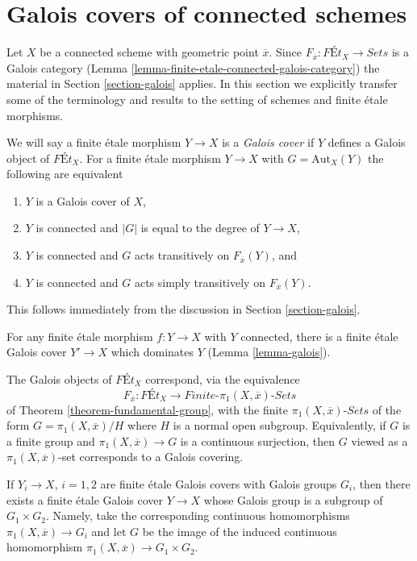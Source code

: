 \documentclass{stacks-project}
\theoremstyle{plain}
\theoremstyle{definition}
\theoremstyle{remark}
\numberwithin{equation}{subsection}
\begin{document}
\section{Galois covers of connected schemes}
\label{section-finite-etale-under-galois}

\noindent
Let $X$ be a connected scheme with geometric point $\overline{x}$.
Since $F_{\overline{x}} : \textit{F\'Et}_X \to \textit{Sets}$ is a
Galois category (Lemma \ref{lemma-finite-etale-connected-galois-category})
the material in Section \ref{section-galois} applies.
In this section we explicitly transfer some of the terminology
and results to the setting of schemes and finite \'etale morphisms.

\medskip\noindent
We will say a finite \'etale morphism $Y \to X$ is a
{\it Galois cover} if $Y$ defines a Galois object of
$\textit{F\'Et}_X$.
For a finite \'etale morphism $Y \to X$ with $G = \text{Aut}_X(Y)$
the following are equivalent
\begin{enumerate}
\item $Y$ is a Galois cover of $X$,
\item $Y$ is connected and $|G|$ is equal to the degree of $Y \to X$,
\item $Y$ is connected and $G$ acts transitively on $F_{\overline{x}}(Y)$, and
\item $Y$ is connected and $G$ acts simply transitively on
$F_{\overline{x}}(Y)$.
\end{enumerate}
This follows immediately from the discussion in Section \ref{section-galois}.

\medskip\noindent
For any finite \'etale morphism $f : Y \to X$ with $Y$ connected,
there is a finite \'etale Galois cover $Y' \to X$ which dominates $Y$
(Lemma \ref{lemma-galois}).

\medskip\noindent
The Galois objects of $\textit{F\'Et}_X$ correspond, via the equivalence
$$
F_{\overline{x}} : \textit{F\'Et}_X \to
\textit{Finite-}\pi_1(X, \overline{x})\textit{-Sets}
$$
of Theorem \ref{theorem-fundamental-group},
with the finite $\pi_1(X, \overline{x})\textit{-Sets}$
of the form $G = \pi_1(X, \overline{x})/H$ where $H$ is a
normal open subgroup. Equivalently, if $G$ is a finite group
and $\pi_1(X, \overline{x}) \to G$ is a continuous surjection,
then $G$ viewed as a $\pi_1(X, \overline{x})$-set corresponds
to a Galois covering.

\medskip\noindent
If $Y_i \to X$, $i = 1, 2$ are finite \'etale Galois covers
with Galois groups $G_i$, then there exists a finite \'etale
Galois cover $Y \to X$ whose Galois group is a subgroup of
$G_1 \times G_2$. Namely, take the corresponding continuous
homomorphisms $\pi_1(X, \overline{x}) \to G_i$ and
let $G$ be the image of the induced continuous homomorphism
$\pi_1(X, \overline{x}) \to G_1 \times G_2$.
\end{document}
